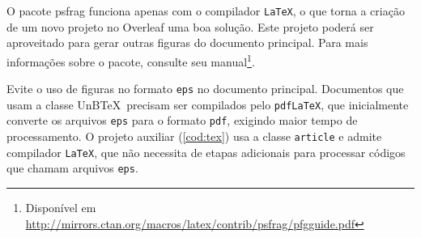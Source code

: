 

O pacote \textsf{psfrag} funciona apenas com o compilador \texttt{LaTeX}, o que torna a criação de um novo projeto no Overleaf uma boa solução. Este projeto poderá ser aproveitado para gerar outras figuras do documento principal. Para mais informações sobre o pacote, consulte seu manual\footnote{Disponível em \url{http://mirrors.ctan.org/macros/latex/contrib/psfrag/pfgguide.pdf}}.

Evite o uso de figuras no formato \texttt{eps} no documento principal. Documentos que usam a classe UnB\TeX\ precisam ser compilados pelo \texttt{pdfLaTeX}, que inicialmente converte os arquivos \texttt{eps} para o formato \texttt{pdf}, exigindo maior tempo de processamento. O projeto auxiliar (\cref{cod:tex}) usa a classe \texttt{article} e admite compilador \texttt{LaTeX}, que não necessita de etapas adicionais para processar códigos que chamam arquivos \texttt{eps}.